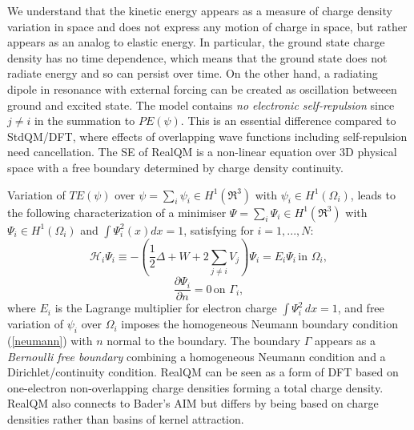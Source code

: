 \documentclass[11pt]{article} %
\begin{document}
We understand that the kinetic energy appears as a measure of charge density variation in space and does not express any motion of charge in space,  but rather appears as an analog to elastic energy.  In particular,  the ground state charge density has no time dependence,  which means that the ground state does not radiate energy and so can persist over time.  On the other hand,  a radiating dipole in resonance with external forcing can be created as oscillation betweeen ground and excited state.  The model contains \emph{no electronic self-repulsion} since $j\neq i$ in the summation to $PE (\psi )$.  This is an essential difference compared to StdQM/DFT,  where effects of overlapping wave functions including self-repulsion need cancellation. The SE of RealQM is a non-linear equation over 3D physical space with a free boundary determined by charge density continuity.


Variation of $TE(\psi )$ over $\psi =\sum_i\psi_i\in H^1(\Re^3)$ with $\psi_i\in H^1(\Omega_i )$,  leads to the following characterization of a minimiser $\Psi =\sum_i\Psi_i\in H^1(\Re^3)$ with $\Psi_i\in H^1(\Omega_i)$ and $\int\Psi_i^2(x)dx=1$,  satisfying for $i=1,...,N$:
\begin{equation}\label{Hi}
\mathcal{H}_i\Psi_i\equiv -(\frac{1}{2}\Delta+W+2\sum_{j\neq i}V_j)\Psi_i = E_i\Psi_i\,\mbox{in }\Omega_i,
\end{equation}
\begin{equation}\label{neumann}
 \frac{\partial\Psi_i}{\partial n}=0\,\mbox{on }\Gamma_i,
\end{equation}
where $E_i$ is the Lagrange multiplier for electron charge $\int\Psi_i^2\,dx=1$,  and free variation of  $\psi_i$ over $\Omega_i$ imposes the homogeneous Neumann boundary condition (\ref{neumann}) with $n$ normal to the boundary.  The boundary $\Gamma$ appears as a \emph{Bernoulli free boundary} combining a homogeneous Neumann condition and a Dirichlet/continuity condition.  RealQM can be seen as a form of DFT \cite{koch} based on one-electron non-overlapping charge densities forming a total charge density.  RealQM also connects to Bader's AIM \cite{bader} but differs by being based on charge densities rather than basins of kernel attraction. 
\end{document}
